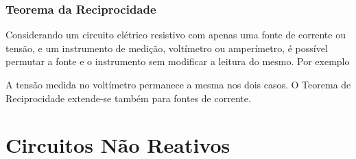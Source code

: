 \documentclass{article}
\numberwithin{equation}{section}
\newlength\Colsep
\begin{document}
\subsubsection{Teorema da Reciprocidade}
Considerando um circuito elétrico resistivo com apenas uma fonte de corrente ou tensão, e um instrumento de medição, voltímetro ou amperímetro, é possível permutar a fonte e o instrumento sem modificar a leitura do mesmo. Por exemplo

\noindent\begin{minipage}{\textwidth}
\begin{minipage}[b][5cm][b]{\dimexpr0.5\textwidth-0.5\Colsep\relax}
    \begin{center}
    \end{center}
\end{minipage}
\begin{minipage}[b][5cm][b]{\dimexpr0.5\textwidth-0.5\Colsep\relax}
    \begin{center}
    \end{center}
\end{minipage}
\end{minipage}

\vspace{0.5cm}
A tensão medida no voltímetro permanece a mesma nos dois casos. O Teorema de Reciprocidade extende-se também para fontes de corrente.

\newpage

\section{Circuitos Não Reativos}
\label{sec:resistivos}
\end{document}

